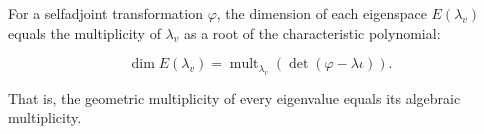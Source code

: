 For a selfadjoint transformation $\varphi$, the dimension of each eigenspace $E(\lambda_v)$ equals the multiplicity of $\lambda_v$ as a root of the characteristic polynomial:

$$\dim E(\lambda_v) = \operatorname{mult}_{\lambda_v}(\det(\varphi - \lambda \iota)).$$

That is, the geometric multiplicity of every eigenvalue equals its algebraic multiplicity.
